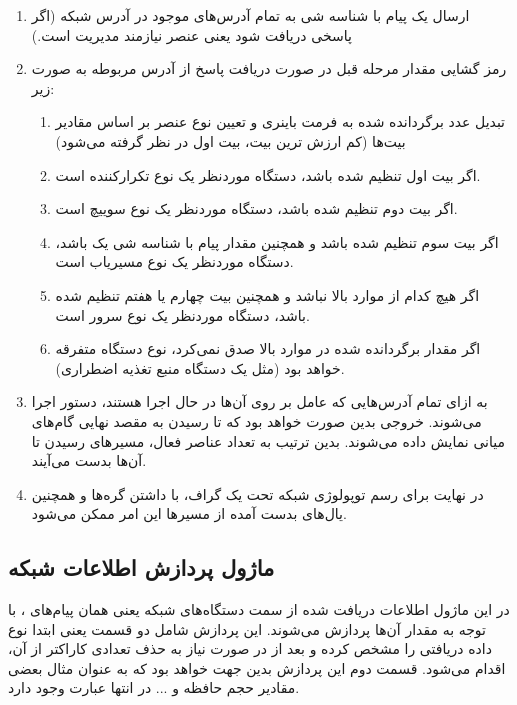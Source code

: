\begin{enumerate}
    \item ارسال یک پیام  با شناسه شی  به تمام آدرس‌های موجود در آدرس شبکه (اگر پاسخی دریافت شود یعنی عنصر نیازمند مدیریت است.)
    \item رمز گشایی مقدار مرحله قبل در صورت دریافت پاسخ از آدرس مربوطه به صورت زیر:
    \begin{enumerate}
        \item تبدیل عدد برگردانده شده به فرمت باینری و تعیین نوع عنصر بر اساس مقادیر بیت‌ها (کم ارزش ترین بیت، بیت اول در نظر گرفته می‌شود)
        \item اگر بیت اول تنظیم شده باشد، دستگاه موردنظر یک نوع تکرارکننده است.
        \item اگر بیت دوم تنظیم شده باشد، دستگاه موردنظر یک نوع سوییچ است.
        \item اگر بیت سوم تنظیم شده باشد و همچنین مقدار پیام  با شناسه شی  یک باشد، دستگاه موردنظر یک نوع مسیریاب است.
        \item اگر هیچ کدام از موارد بالا نباشد و همچنین بیت چهارم یا هفتم تنظیم شده باشد، دستگاه موردنظر یک نوع سرور است.
        \item اگر مقدار برگردانده شده در موارد بالا صدق نمی‌کرد، نوع دستگاه متفرقه خواهد بود (مثل یک دستگاه منبع تغذیه اضطراری). 
    \end{enumerate}
    \item به ازای تمام آدرس‌هایی که عامل  بر روی آن‌ها در حال اجرا هستند، دستور  اجرا می‌شوند. خروجی بدین صورت خواهد بود که تا رسیدن به مقصد نهایی گام‌های میانی نمایش داده می‌شوند. بدین ترتیب به تعداد عناصر فعال، مسیرهای رسیدن تا آن‌ها بدست می‌آیند.
    \item در نهایت برای رسم توپولوژی شبکه تحت یک گراف، با داشتن گره‌ها و همچنین یال‌های بدست آمده از مسیرها این امر ممکن می‌شود.
\end{enumerate}




\subsection{ماژول پردازش اطلاعات شبکه}

در این ماژول اطلاعات دریافت شده از سمت دستگاه‌های شبکه یعنی همان پیام‌های ، با توجه به مقدار آن‌ها پردازش می‌شوند. این پردازش شامل دو قسمت یعنی ابتدا نوع داده دریافتی را مشخص کرده و بعد از در صورت نیاز به حذف تعدادی کاراکتر از آن، اقدام می‌شود. قسمت دوم این پردازش بدین جهت خواهد بود که به عنوان مثال بعضی مقادیر حجم حافظه و ... در انتها عبارت  وجود دارد.

